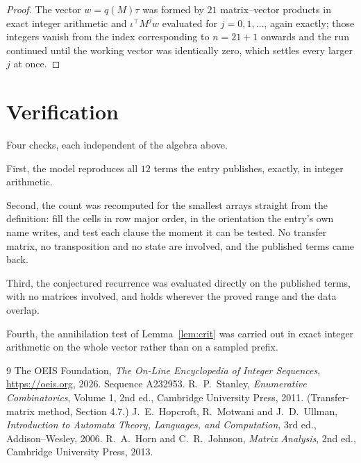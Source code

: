 \documentclass[11pt,a4paper]{article}
\theoremstyle{plain}
\theoremstyle{definition}
\begin{document}
\begin{proof}
The vector $w=q(M)\tau$ was formed by $21$ matrix--vector products in exact integer
arithmetic and $\iota^{\!\top}M^{j}w$ evaluated for $j=0,1,\dots$, again exactly; those
integers vanish from the index corresponding to $n=21+1$ onwards and the run continued
until the working vector was identically zero, which settles every larger $j$ at once.
\end{proof}

\section{Verification}

Four checks, each independent of the algebra above.

First, the model reproduces all $12$ terms the entry publishes, exactly, in integer
arithmetic.

Second, the count was recomputed for the smallest arrays straight from the definition: fill the
cells in row major order, in the orientation the entry's own name writes, and test each clause
the moment it can be tested. No transfer matrix, no transposition and no state are involved,
and the published terms came back.

Third, the conjectured recurrence was evaluated directly on the published terms, with no
matrices involved, and holds wherever the proved range and the data overlap.

Fourth, the annihilation test of Lemma~\ref{lem:crit} was carried out in exact integer
arithmetic on the whole vector rather than on a sampled prefix.

\begin{thebibliography}{9}
 The OEIS Foundation, \emph{The On-Line Encyclopedia of Integer
Sequences}, \url{https://oeis.org}, 2026. Sequence A232953.
 R.~P.~Stanley, \emph{Enumerative Combinatorics}, Volume 1, 2nd ed.,
Cambridge University Press, 2011. (Transfer-matrix method, Section 4.7.)
 J.~E.~Hopcroft, R.~Motwani and J.~D.~Ullman, \emph{Introduction to Automata
Theory, Languages, and Computation}, 3rd ed., Addison--Wesley, 2006.
 R.~A.~Horn and C.~R.~Johnson, \emph{Matrix Analysis}, 2nd ed., Cambridge
University Press, 2013.
\end{thebibliography}
\end{document}
